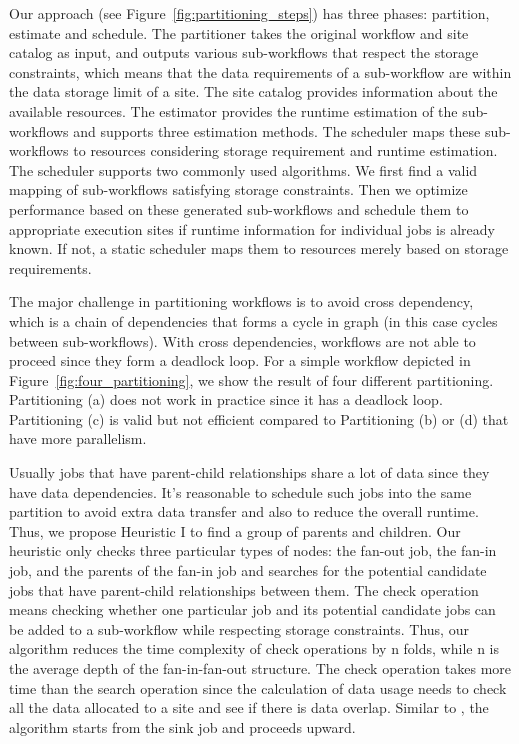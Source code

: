 Our approach (see Figure~\ref{fig:partitioning_steps}) has three phases: partition, estimate and schedule. The partitioner takes the original workflow and site catalog as input, and outputs various sub-workflows that respect the storage constraints, which means that the data requirements of a sub-workflow are within the data storage limit of a site. The site catalog provides information about the available resources. The estimator provides the runtime estimation of the sub-workflows and supports three estimation methods. The scheduler maps these sub-workflows to resources considering storage requirement and runtime estimation. The scheduler supports two commonly used algorithms. We first find a valid mapping of sub-workflows satisfying storage constraints. Then we optimize performance based on these generated sub-workflows and schedule them to appropriate execution sites if runtime information for individual jobs is already known. If not, a static scheduler maps them to resources merely based on storage requirements. 

The major challenge in partitioning workflows is to avoid cross dependency, which is a chain of dependencies that forms a cycle in graph (in this case cycles between sub-workflows). With cross dependencies, workflows are not able to proceed since they form a deadlock loop. For a simple workflow depicted in Figure~\ref{fig:four_partitioning}, we show the result of four different partitioning. Partitioning (a) does not work in practice since it has a deadlock loop. Partitioning (c) is valid but not efficient compared to Partitioning (b) or (d) that have more parallelism. 

Usually jobs that have parent-child relationships share a lot of data since they have data dependencies. It’s reasonable to schedule such jobs into the same partition to avoid extra data transfer and also to reduce the overall runtime. Thus, we propose Heuristic I to find a group of parents and children. Our heuristic only checks three particular types of nodes: the fan-out job, the fan-in job, and the parents of the fan-in job and searches for the potential candidate jobs that have parent-child relationships between them. The check operation means checking whether one particular job and its potential candidate jobs can be added to a sub-workflow while respecting storage constraints. Thus, our algorithm reduces the time complexity of check operations by n folds, while n is the average depth of the fan-in-fan-out structure. The check operation takes more time than the search operation since the calculation of data usage needs to check all the data allocated to a site and see if there is data overlap. Similar to \cite{Topcuoglu2002}, the algorithm starts from the sink job and proceeds upward. 

